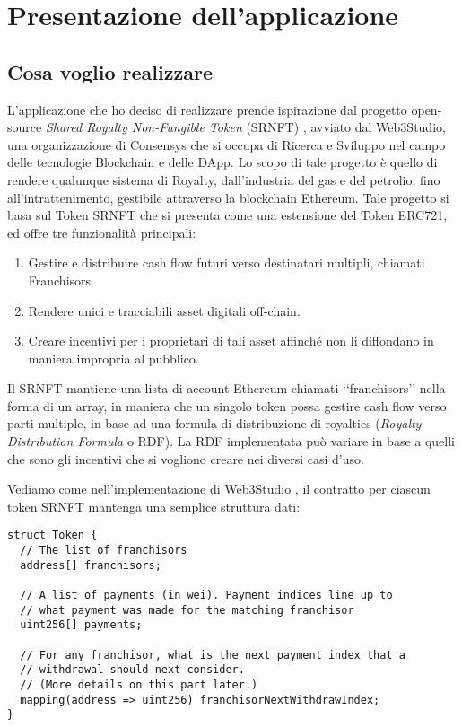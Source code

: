 \chapter{Presentazione dell'applicazione}

\section{Cosa voglio realizzare}
L'applicazione che ho deciso di realizzare prende ispirazione dal progetto open-source \textit{Shared Royalty Non-Fungible Token} (SRNFT) \cite{K7}, avviato dal Web3Studio, una organizzazione di Consensys che si occupa di Ricerca e Sviluppo nel campo delle tecnologie Blockchain e delle DApp. Lo scopo di tale progetto è quello di rendere qualunque sistema di Royalty, dall'industria del gas e del petrolio, fino all'intrattenimento, gestibile attraverso la blockchain Ethereum. Tale progetto si basa sul Token SRNFT che si presenta come una estensione del Token ERC721, ed offre tre funzionalità principali:
\begin{enumerate}
    \item Gestire e distribuire cash flow futuri verso destinatari multipli, chiamati Franchisors.
    \item Rendere unici e tracciabili asset digitali off-chain.
    \item Creare incentivi per i proprietari di tali asset affinché non li diffondano in maniera impropria al pubblico.
\end{enumerate}
Il SRNFT mantiene una lista di account Ethereum chiamati ‘‘franchisors’’ nella forma di un array, in maniera che un singolo token possa gestire cash flow verso parti multiple, in base ad una formula di distribuzione di royalties (\textit{Royalty Distribution Formula} o RDF). La RDF implementata può variare in base a quelli che sono gli incentivi che si vogliono creare nei diversi casi d'uso.

Vediamo come nell'implementazione di Web3Studio \cite{K7}, il contratto per ciascun token SRNFT mantenga una semplice struttura dati:

\begin{lstlisting}[language=Solidity,numbers=none]
struct Token {
  // The list of franchisors
  address[] franchisors;

  // A list of payments (in wei). Payment indices line up to
  // what payment was made for the matching franchisor
  uint256[] payments;

  // For any franchisor, what is the next payment index that a
  // withdrawal should next consider.
  // (More details on this part later.)
  mapping(address => uint256) franchisorNextWithdrawIndex;
}
\end{lstlisting}

